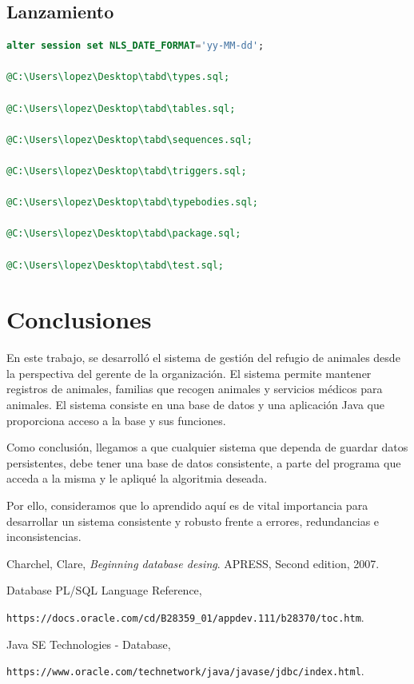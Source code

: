 \documentclass{FR16}
\begin{document}
\subsection{Lanzamiento}
\begin{lstlisting}[language=Sql, basicstyle=\scriptsize]
alter session set NLS_DATE_FORMAT='yy-MM-dd';

@C:\Users\lopez\Desktop\tabd\types.sql;

@C:\Users\lopez\Desktop\tabd\tables.sql;

@C:\Users\lopez\Desktop\tabd\sequences.sql;

@C:\Users\lopez\Desktop\tabd\triggers.sql;

@C:\Users\lopez\Desktop\tabd\typebodies.sql;

@C:\Users\lopez\Desktop\tabd\package.sql;

@C:\Users\lopez\Desktop\tabd\test.sql;
\end{lstlisting}
\newpage


\section{Conclusiones}
\begin{justify}
En este trabajo, se desarrolló el sistema de gestión del refugio de animales desde la perspectiva del gerente de la organización. El sistema permite mantener registros de animales, familias que recogen animales y servicios médicos para animales. El sistema consiste en una base de datos y una aplicación Java que proporciona acceso a la base y sus funciones.

Como conclusión, llegamos a que cualquier sistema que dependa de guardar datos persistentes, debe tener una base de datos consistente, a parte del programa que acceda a la misma y le apliqué la algoritmia deseada.

Por ello, consideramos que lo aprendido aquí es de vital importancia para desarrollar un sistema consistente y robusto frente a errores, redundancias e inconsistencias.
\end{justify}

\newpage
\begin{thebibliography}{9}

Charchel, Clare, \emph{Beginning database desing}. APRESS, Second edition, 2007.

Database PL/SQL Language Reference, 

\hspace{10mm}\texttt{https://docs.oracle.com/cd/B28359_01/appdev.111/b28370/toc.htm}.

Java SE Technologies - Database, 

\hspace{10mm}\texttt{https://www.oracle.com/technetwork/java/javase/jdbc/index.html}.
\end{thebibliography}
\end{document}
